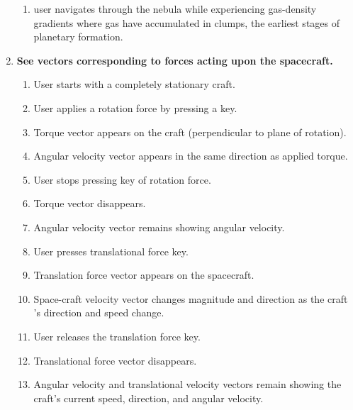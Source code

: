 \begin{enumerate}
\begin{enumerate}
  \item user navigates through the nebula while experiencing gas-density gradients where gas have accumulated in clumps, the earliest stages of planetary formation.

\end{enumerate}

\item\textbf{See vectors corresponding to forces acting upon the spacecraft.}
\begin{enumerate}

  \item User starts with a completely stationary craft.

  \item User applies a rotation force by pressing a key.

  \item Torque vector appears on the craft (perpendicular to plane of rotation).
  
  \item Angular velocity vector appears in the same direction as applied torque.

  \item User stops pressing key of rotation force.

  \item Torque vector disappears.

  \item Angular velocity vector remains showing angular velocity.

  \item User presses translational force key.

  \item Translation force vector appears on the spacecraft.

  \item Space-craft velocity vector changes magnitude and direction as the craft
's direction and speed change.

  \item User releases the translation force key.

  \item Translational force vector disappears.

  \item Angular velocity and translational velocity vectors remain showing the craft's current speed, direction, and angular velocity.

\end{enumerate}

\end{enumerate}


